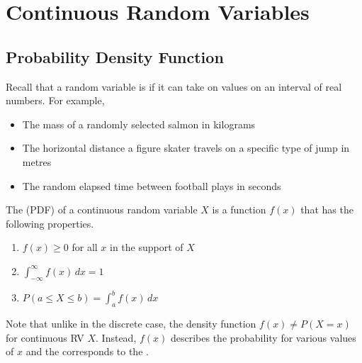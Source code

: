 \chapter{Continuous Random Variables}

\section{Probability Density Function}

Recall that a random variable is  if it can take on values on an interval of real numbers. For example, 

\begin{itemize}
    \item The mass of a randomly selected salmon in kilograms 
    \item The horizontal distance a figure skater travels on a specific type of jump in metres 
    \item The random elapsed time between football plays in seconds
\end{itemize}

\begin{definition}
    The  (PDF) of a continuous random variable $X$ is a function $f(x)$ that has the following properties.

    \begin{enumerate}
        \item $f(x) \ge 0$ for all $x$ in the support of $X$
        \vspace{0.5em}
        \item $\int_{-\infty}^{\infty} f(x) \,dx = 1$
        \item $P(a \le X \le b) = \int_a^b f(x) \,dx$
    \end{enumerate}
\end{definition}

Note that unlike in the discrete case, the density function $f(x) \neq P(X = x)$ for continuous RV $X$. Instead, $f(x)$ describes the probability  for various values of $x$ and the  corresponds to the .

